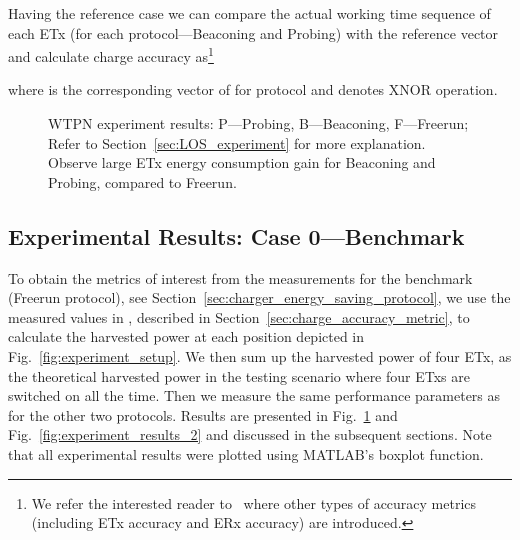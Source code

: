 \documentclass[11pt,draftclsnofoot,journal,onecolumn]{IEEEtran}
\begin{document}
Having the reference case we can compare the actual working time sequence of each ETx  (for each protocol---Beaconing and Probing) with the reference vector  and calculate charge accuracy as\footnote{We refer the interested reader to~\cite[Ch. 5]{golinski_msc_2015} where other types of accuracy metrics (including ETx accuracy and ERx accuracy) are introduced.} 

where  is the corresponding vector of for protocol  and  denotes XNOR operation.
\begin{figure}
\centering
{}
\caption{WTPN experiment results: P---Probing, B---Beaconing, F---Freerun; Refer to Section~\ref{sec:LOS_experiment} for more explanation. Observe large ETx energy consumption gain for Beaconing and Probing, compared to Freerun.}
\label{fig:experiment_results_1}
\end{figure}

\subsection{Experimental Results: Case 0---Benchmark}
\label{sec:benchmark_measurements}

To obtain the metrics of interest from the measurements for the benchmark (Freerun protocol), see Section~\ref{sec:charger_energy_saving_protocol}, we use the measured values in , described in Section~\ref{sec:charge_accuracy_metric}, to calculate the harvested power at each position depicted in Fig.~\ref{fig:experiment_setup}. We then sum up the harvested power of four ETx, as the theoretical harvested power in the testing scenario where four ETxs are switched on all the time. Then we measure the same performance parameters as for the other two protocols. Results are presented in Fig.~\ref{fig:experiment_results_1} and Fig.~\ref{fig:experiment_results_2} and discussed in the subsequent sections. Note that all experimental results were plotted using MATLAB's \textsf{boxplot} function.
\end{document}
